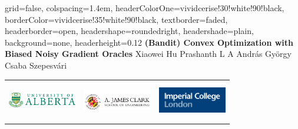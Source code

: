\documentclass[landscape,a0paper,fontscale=0.292]{baposter}
\begin{document}
\begin{poster}
{
 grid=false,
 colspacing=1.4em,
 headerColorOne=vividcerise!30!white!90!black,
 borderColor=vividcerise!35!white!90!black,
 textborder=faded,
 headerborder=open,
 headershape=roundedright,
 headershade=plain,
 background=none,
 headerheight=0.12\textheight}
 {
 }
 {\sc\LARGE \bf{(Bandit) Convex Optimization with Biased Noisy Gradient Oracles} \vspace{1ex}}
 {Xiaowei  Hu \hspace{1em} Prashanth L A \hspace{1em} Andr\'as Gy\"orgy \hspace{1em} Csaba Szepesv\'ari}
 {
\begin{tabular}{ccc}
\includegraphics[width=3cm,height=1.4cm]{fig/u-of-alberta-logo}& 
\includegraphics[width=3cm,height=1.7cm]{fig/clark.png} &
\includegraphics[width=3cm,height=1.5cm]{fig/icl.png} 
\end{tabular}
}


\end{poster}
\end{document}
